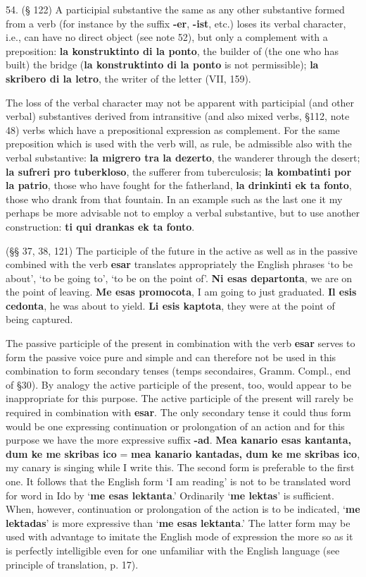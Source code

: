 54. (§ 122) A participial substantive the same as any other substantive formed from a verb (for instance by the suffix \textbf{-er}, \textbf{-ist}, etc.) loses its verbal character, i.e., can have no direct object (see note 52), but only a complement with a preposition: \textbf{la konstruktinto di la ponto}, the builder of (the one who has built) the bridge (\textbf{la konstruktinto di la ponto} is not permissible); \textbf{la skribero di la letro}, the writer of the letter (VII, 159). %

The loss of the verbal character may not be apparent with participial (and other verbal) substantives derived from intransitive (and also mixed verbs, §112, note 48) verbs which have a prepositional expression as complement. For the same preposition which is used with the verb will, as rule, be admissible also with the verbal substantive: \textbf{la migrero tra la dezerto}, the wanderer through the desert; \textbf{la sufreri pro tuberkloso}, the sufferer from tuberculosis; \textbf{la kombatinti por la patrio}, those who have fought for the fatherland, \textbf{la drinkinti ek ta fonto}, those who drank from that fountain. In an example such as the last one it my perhaps be more advisable not to employ a verbal substantive, but to use another construction: \textbf{ti qui drankas ek ta fonto}.

(§§ 37, 38, 121) The participle of the future in the active as well as in the passive combined with the verb \textbf{esar} translates appropriately the English phrases `to be about',  `to be going to', `to be on the point of'. \textbf{Ni esas departonta}, we are on the point of leaving. \textbf{Me esas promocota}, I am going to just graduated. \textbf{Il esis cedonta}, he was about to yield. \textbf{Li esis kaptota}, they were at the point of being captured.

The passive participle of the present in combination with the verb \textbf{esar} serves to form the passive voice pure and simple and can therefore not be used in this combination to form secondary tenses (temps secondaires, Gramm. Compl., end of  §30). By analogy the active participle of the present, too, would appear to be inappropriate for this purpose. The active participle of the present will rarely be required in combination with \textbf{esar}. The only secondary tense it could thus form would be one expressing continuation or prolongation of an action and for this purpose we have the more expressive suffix \textbf{-ad}. \textbf{Mea kanario esas kantanta, dum ke me skribas ico} = \textbf{mea kanario kantadas, dum ke me skribas ico}, my canary is singing while I write this. The second form is preferable to the first one. It follows that the English form `I am reading' is not to be translated word for word in Ido by `\textbf{me esas lektanta}.' Ordinarily `\textbf{me lektas}' is sufficient. When, however, continuation or prolongation of the action is to be indicated, `\textbf{me lektadas}' is more expressive than `\textbf{me esas lektanta}.' The latter form may be used with advantage to imitate the English mode of expression the more so as it is perfectly intelligible even for one unfamiliar with the English language (see principle of translation, p. 17).

